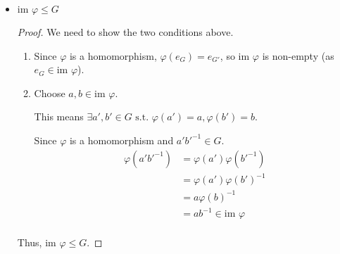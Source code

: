 \documentclass[12pt,letterpaper]{article}
\newcommand{\KER}[1]{\text{ker }#1}
\newcommand{\IM}[1]{\text{im }#1}
\begin{document}
\begin{enumerate}
\begin{itemize}
\begin{proof}
\begin{enumerate}
                So we have, $\varphi(a) = e_{G'}$ and $\varphi(b) = e_{G'}$,
                and since $\varphi$ is a homomorphism.
                \begin{align*}
                  \varphi(ab^{-1}) &= \varphi(a)\varphi(b^{-1}) \\
                  &= \varphi(a)\varphi(b)^{-1} \\
                  &= e_{G'}\varphi(b)^{-1} \\
                  &= e_{G'}e_{G'}^{-1} \\
                  &= e_{G'}e_{G'} \\
                  &= e_{G'}
                \end{align*}
            \end{enumerate}

            Thus, $\KER{\varphi} \le G$.
          \end{proof}

        \item $\IM{\varphi} \le G$

          \begin{proof}
            We need to show the two conditions above.

            \begin{enumerate}
              \item
                Since $\varphi$ is a homomorphism, $\varphi(e_G) = e_{G'}$,
                so $\IM{\varphi}$ is non-empty (as $e_G \in \IM{\varphi}$).
              \item
                Choose $a, b \in \IM{\varphi}$.

                This means $\exists a', b' \in G \text{ s.t. } \varphi(a') = a, \varphi(b') = b$.

                Since $\varphi$ is a homomorphism and $a'b'^{-1} \in G$.
                \begin{align*}
                  \varphi(a'b'^{-1}) &= \varphi(a')\varphi(b'^{-1}) \\
                  &= \varphi(a')\varphi(b')^{-1} \\
                  &= a\varphi(b)^{-1} \\
                  &= ab^{-1} \in \IM{\varphi} \\
                \end{align*}
            \end{enumerate}

            Thus, $\IM{\varphi} \le G$.
          \end{proof}
      \end{itemize}


\end{enumerate}
\end{document}
